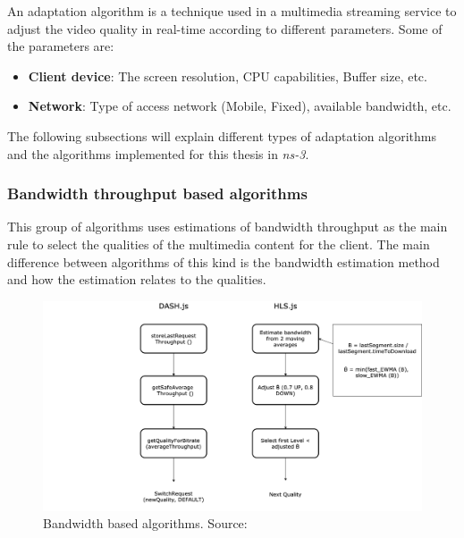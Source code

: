 An adaptation algorithm is a technique used in a multimedia streaming service to adjust the video quality
in real-time according to different parameters. Some of the parameters are:

\begin{itemize}
  \item \textbf{Client device}: The screen resolution, CPU capabilities, Buffer size, etc.
  \item \textbf{Network}: Type of access network (Mobile, Fixed), available bandwidth, etc.
\end{itemize}

The following subsections will explain different types of adaptation algorithms and the algorithms implemented
for this thesis in \textit{ns-3}.

\subsubsection{Bandwidth throughput based algorithms}

This group of algorithms uses estimations of bandwidth throughput as the main rule to select
the qualities of the multimedia content for the client. The main difference between algorithms of
this kind is the bandwidth estimation method and how the estimation relates to the qualities. 

\begin{figure}[h]
  \centering
  \includegraphics[width=\textwidth]{img/dashjs.png}
  \caption{Bandwidth based algorithms. Source: \cite{abr1}}
  \label{fig:throughput}
\end{figure}

